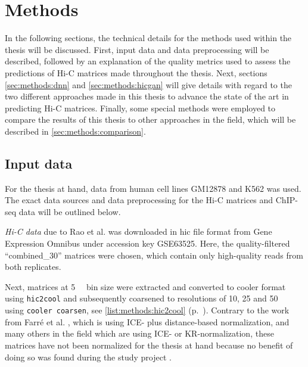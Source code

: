 \section{Methods}
In the following sections, the technical details for the methods used within the thesis will be discussed.
First, input data and data preprocessing will be described, followed by an explanation of the quality metrics used to assess the predictions
of Hi-C matrices made throughout the thesis.
Next, sections \ref{sec:methods:dnn} and \ref{sec:methods:hicgan} will give details with regard to the two 
different approaches made in this thesis to advance the state of the art in predicting Hi-C matrices.
Finally, some special methods were employed to compare the results of this thesis to 
other approaches in the field, which will be described in \cref{sec:methods:comparison}.

\subsection{Input data} \label{sec:methods:input_data}
For the thesis at hand, data from human cell lines GM12878 and K562 was used.
The exact data sources and data preprocessing for the Hi-C matrices and ChIP-seq data 
will be outlined below.

\emph{Hi-C data} due to Rao et al. \cite{Rao2014} was downloaded 
in hic file format from Gene Expression Omnibus under accession key GSE63525.
Here, the quality-filtered ``combined\_30'' matrices were chosen, which contain only high-quality reads from 
both replicates.

Next, matrices at \SI{5}{\kilo\bp} bin size were extracted and converted to cooler format using \texttt{hic2cool}
and subsequently coarsened to resolutions of 10, 25 and \SI{50}{\kilo\bp} using \texttt{cooler coarsen},
see \cref{list:methods:hic2cool} (p.~\pageref{list:methods:hic2cool}).
Contrary to the work from Farr\'e et al. \cite{Farre2018a}, which is using ICE- plus distance-based normalization,
and many others in the field which are using ICE- or KR-normalization, 
these matrices have not been normalized for the thesis at hand
because no benefit of doing so was found during the study project \cite{Krauth2020}.


